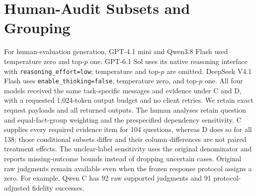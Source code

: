 \documentclass[11pt]{article}
\DeclareRobustCommand{\claim}[2]{#2}
\begin{document}
\section{Human-Audit Subsets and Grouping}
\label{app:human-settings}
\claim{HUMANPROTOCOL}{For human-evaluation generation, GPT-4.1 mini and Qwen3.8 Flash used temperature zero and top-$p$ one. GPT-6.1 Sol uses its native reasoning interface with \texttt{reasoning\_effort=low}; temperature and top-$p$ are omitted. DeepSeek V4.1 Flash uses \texttt{enable\_thinking=false}, temperature zero, and top-$p$ one. All four models received the same task-specific messages and evidence under C and D, with a requested 1,024-token output budget and no client retries. We retain exact request payloads and all returned outputs.}
\claim{APPSENS}{The human analyses retain question and equal-fact-group weighting and the prespecified dependency sensitivity. C supplies every required evidence item for 104 questions, whereas D does so for all 138; those conditional subsets differ and their column differences are not paired treatment effects. The unclear-label sensitivity uses the original denominator and reports missing-outcome bounds instead of dropping uncertain cases. Original raw judgments remain available even when the frozen response protocol assigns a zero. For example, Qwen C has 92 raw supported judgments and 91 protocol-adjusted fidelity successes.}
\begin{table}[tp]
\centering\small

\caption{\claim{CAPHUMANSENS}{Question and equal-fact-group human outcomes (\%). Parentheses show eligible question counts, including in the equal-group columns. Value and qualification roles have structural N/A cases; failures on eligible questions remain zero.}}
\end{table}
\begin{table}[tp]
\centering\small

\caption{\claim{CAPCONDITIONAL}{Human outcomes conditional on all required authority being supplied. C and D use different subsets, so these columns are descriptive, not a paired treatment-effect estimate.}}
\end{table}
\begin{table}[tp]
\centering\small

\caption{\claim{CAPHUMANSENS}{Frozen paired D-minus-C human sensitivities, in percentage points, resampling whole operational fact or dependency groups. Intervals are descriptive and are not multiple-comparison-adjusted population inference.}}
\end{table}
\begin{table}[tp]
\centering\footnotesize\setlength{\tabcolsep}{4pt}

\caption{\claim{CAPLANGUAGE}{Human semantic outcomes by question language. Each cell gives correctness / full-rule completeness / source fidelity in percent; $N$ is the number of questions per model--condition cell. These descriptive slices are confounded with jurisdiction and task composition. French has one question; its eight outputs are insufficient for the prespecified minimum-ten-output agreement slice.}}
\end{table}
\end{document}
